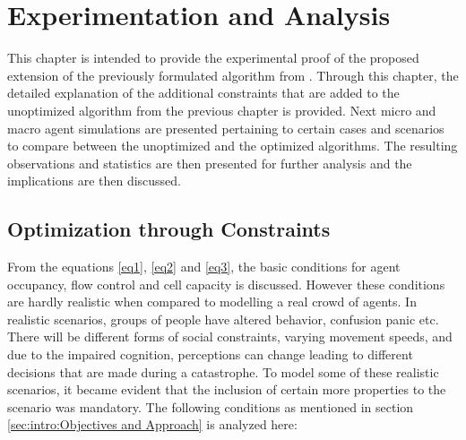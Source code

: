 \chapter{Experimentation and Analysis\label{ch:Experimentation and Analysis}}

This chapter is intended to provide the experimental proof of the proposed extension of the previously formulated algorithm from \cite{ref5}. Through this chapter, the detailed explanation of the additional constraints that are added to the unoptimized algorithm from the previous chapter is provided. Next micro and macro agent simulations are presented pertaining to certain cases and scenarios to compare between the unoptimized and the optimized algorithms. The resulting observations and statistics are then presented for further analysis and the implications are then discussed.

\section{Optimization through Constraints}
\label{sec: Optimization through Constraints}

From the equations \ref{eq1}, \ref{eq2} and \ref{eq3}, the basic conditions for agent occupancy, flow control and cell capacity is discussed. However these conditions are hardly realistic when compared to modelling a real crowd of agents. In realistic scenarios, groups of people have altered behavior, confusion panic etc. There will be different forms of social constraints, varying movement speeds, and due to the impaired cognition, perceptions can change leading to different decisions that are made during a catastrophe. To model some of these realistic scenarios, it became evident that the inclusion of certain more properties to the scenario was mandatory. The following conditions as mentioned in section \ref{sec:intro:Objectives and Approach} is analyzed here:

